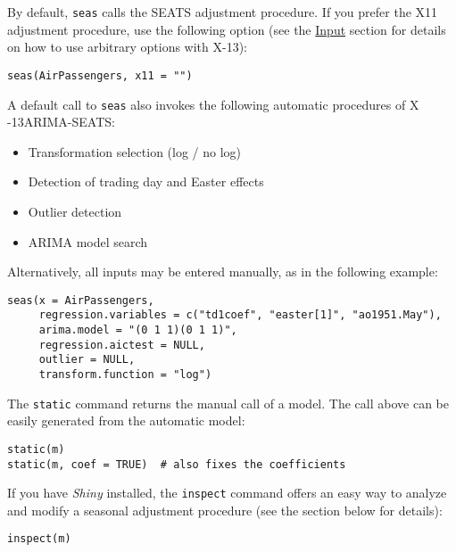 By default, \texttt{seas} calls the SEATS adjustment procedure. If you
prefer the X11 adjustment procedure, use the following option (see the
\hyperref[input]{Input} section for details on how to use arbitrary
options with X-13):

\begin{verbatim}
seas(AirPassengers, x11 = "")
\end{verbatim}

A default call to \texttt{seas} also invokes the following automatic
procedures of X -13ARIMA-SEATS:

\begin{itemize}
\itemsep1pt\parskip0pt
\item
  Transformation selection (log / no log)
\item
  Detection of trading day and Easter effects
\item
  Outlier detection
\item
  ARIMA model search
\end{itemize}

Alternatively, all inputs may be entered manually, as in the following
example:

\begin{verbatim}
seas(x = AirPassengers, 
     regression.variables = c("td1coef", "easter[1]", "ao1951.May"), 
     arima.model = "(0 1 1)(0 1 1)", 
     regression.aictest = NULL,
     outlier = NULL, 
     transform.function = "log")
\end{verbatim}

The \texttt{static} command returns the manual call of a model. The call
above can be easily generated from the automatic model:

\begin{verbatim}
static(m)
static(m, coef = TRUE)  # also fixes the coefficients
\end{verbatim}

If you have \emph{Shiny} installed, the \texttt{inspect} command offers
an easy way to analyze and modify a seasonal adjustment procedure (see
the section below for details):

\begin{verbatim}
inspect(m)
\end{verbatim}


